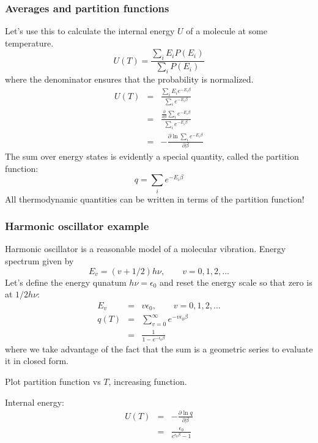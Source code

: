 \documentclass[11pt]{article}
\begin{document}
\subsubsection{Averages and partition functions}
\label{sec:org3cddb87}
Let's use this to calculate the internal energy \(U\) of a molecule at some
temperature.
\begin{equation}
  U(T)=\frac{\sum_iE_iP(E_i)}{\sum_iP(E_i)}
\end{equation}
where the denominator ensures that the probability is normalized.
\begin{eqnarray}
  U(T) & =& \frac{\sum_iE_i e^{-E_i\beta}}{\sum_ie^{-E_i\beta}} \\
  & = & \frac{\frac{\partial}{\partial\beta}\sum_ie^{-E_i\beta}}{\sum_ie^{-E_i
      \beta}}\\
& = & -\frac{\partial \ln \sum_i e^{-E_i\beta}}{\partial \beta}
\end{eqnarray}
The sum over energy states is evidently a special quantity, called the
partition function:
\begin{equation}
  q=\sum_ie^{-E_i\beta}
\end{equation}
All thermodynamic quantities can be written in terms of the partition function!

\subsubsection{Harmonic oscillator example}
\label{sec:org487f7e1}
Harmonic oscillator is a reasonable model of a molecular vibration.  Energy
spectrum given by
\begin{equation}
  E_v=(v+1/2)h\nu,\qquad v=0,1,2,...
\end{equation}
Let's define the energy qunatum \(h\nu=\epsilon_0\) and reset the energy scale so
that zero is at \(1/2 h\nu\):
\begin{eqnarray}
  E_v & = & v\epsilon_0,\qquad v=0,1,2,... \\
q(T) & = &\sum_{v=0}^\infty e^{-v\epsilon_0\beta} \\
 & = & \frac{1}{1-e^{-\epsilon_0\beta}}
\end{eqnarray}
where we take advantage of the fact that the sum is a geometric series to
evaluate it in closed form.

Plot partition function vs \(T\), increasing function.

\noindent Internal energy:
\begin{eqnarray}
  U(T) &=&-\frac{\partial \ln q}{\partial \beta}\\
   & = & \frac{\epsilon_0}{e^{\epsilon_0\beta}-1}
\end{eqnarray}
\end{document}
